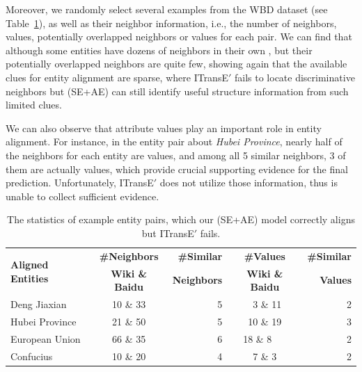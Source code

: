 Moreover, we randomly select several examples from the WBD dataset (see Table~\ref{example}), as well as their neighbor information, i.e.,
the number of neighbors, values, potentially overlapped neighbors or values for each pair. We can find that although some entities have
dozens of neighbors in their own \KGs, but their potentially overlapped neighbors are quite few, showing again that the available clues for
entity alignment are sparse,
 where ITransE$'$ fails to locate discriminative neighbors but \HRGCN (SE+AE) can still identify useful structure information from such limited clues.

We can also observe that attribute values play an important role in entity alignment.
For instance, in the entity pair about \textit{Hubei Province}, nearly half of the neighbors for each entity are values, and among all 5 similar neighbors, 3 of them are actually values,
which provide crucial supporting evidence for the final prediction. Unfortunately, ITransE$'$ does not utilize those information, thus is unable to collect sufficient evidence.

\begin{table}
	\centering
	\scriptsize
	\begin{tabular}{lcrcr}
		\toprule
		\multirow{2}{*}{\bf Aligned Entities} & \bf \#Neighbors & \bf \#Similar & \bf \#Values & \bf \#Similar \\
		&\bf  Wiki \& Baidu &\bf  Neighbors &\bf  Wiki \& Baidu &\bf  Values \\
		\midrule
		Deng Jiaxian & 10 \& 33 & 5 & \ 3 \& 11 & 2\\
		Hubei Province & 21 \& 50 & 5 & 10 \& 19 & 3\\
		European Union & 66 \& 35 & 6 & 18 \& 8\ \ \ & 2\\
		Confucius & 10 \& 20 & 4 & 7 \& 3 & 2\\
		\bottomrule
	\end{tabular}
	\caption{The statistics of example entity pairs, which our \HRGCN(SE+AE) model correctly aligns but ITransE$'$ fails.}
	\label{example}
\end{table}


